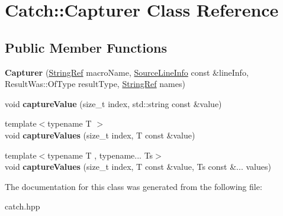 \hypertarget{classCatch_1_1Capturer}{}\section{Catch\+:\+:Capturer Class Reference}
\label{classCatch_1_1Capturer}
\subsection*{Public Member Functions}
\begin{DoxyCompactItemize}
\item 
\mbox{\label{classCatch_1_1Capturer_a86b0b27acc803a4e1310c10820f3038f}} 
{\bfseries Capturer} (\hyperlink{classCatch_1_1StringRef}{String\+Ref} macro\+Name, \hyperlink{structCatch_1_1SourceLineInfo}{Source\+Line\+Info} const \&line\+Info, Result\+Was\+::\+Of\+Type result\+Type, \hyperlink{classCatch_1_1StringRef}{String\+Ref} names)
\item 
\mbox{\label{classCatch_1_1Capturer_a0695ebf77f7cdcb344c73bcb3d9131e4}} 
void {\bfseries capture\+Value} (size\+\_\+t index, std\+::string const \&value)
\item 
\mbox{\label{classCatch_1_1Capturer_a60d08e6db2e54740bb2298bbbec3bc0b}} 
{\footnotesize template$<$typename T $>$ }\\void {\bfseries capture\+Values} (size\+\_\+t index, T const \&value)
\item 
\mbox{\label{classCatch_1_1Capturer_a76f2a097cfeb3042688300b81eb9bcbc}} 
{\footnotesize template$<$typename T , typename... Ts$>$ }\\void {\bfseries capture\+Values} (size\+\_\+t index, T const \&value, Ts const \&... values)
\end{DoxyCompactItemize}


The documentation for this class was generated from the following file\+:\begin{DoxyCompactItemize}
\item 
catch.\+hpp\end{DoxyCompactItemize}
